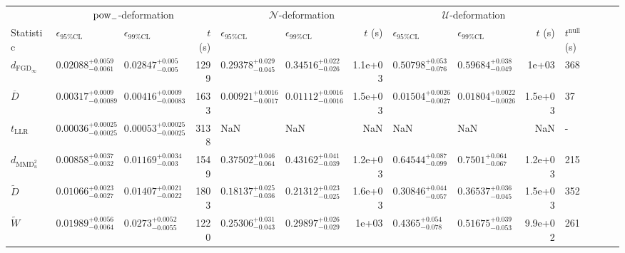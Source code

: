 \begin{tabular}{l|llr|llr|llr|llr}
		\toprule
		\multicolumn{1}{c}{}      & \multicolumn{3}{c}{$\rm{pow}_{-}$-deformation}      & \multicolumn{3}{c}{$\mathcal{N}$-deformation}      & \multicolumn{3}{c}{$\mathcal{U}$-deformation}      & \multicolumn{3}{c}{} \\
		Statistic & $\epsilon_{95\%\mathrm{CL}}$ & $\epsilon_{99\%\mathrm{CL}}$ & $t$ (s) & $\epsilon_{95\%\mathrm{CL}}$ & $\epsilon_{99\%\mathrm{CL}}$ & $t$ (s) & $\epsilon_{95\%\mathrm{CL}}$ & $\epsilon_{99\%\mathrm{CL}}$ & $t$ (s) & $t^{\mathrm{null}}$ (s) \\
		\midrule
		$d_{\mathrm{FGD}_{\infty}}$ & $0.02088_{-0.0061}^{+0.0059}$ & $0.02847_{-0.005}^{+0.005}$ & 1299 & $0.29378_{-0.045}^{+0.029}$ & $0.34516_{-0.026}^{+0.022}$ & 1.1e+03 & $0.50798_{-0.076}^{+0.053}$ & $0.59684_{-0.049}^{+0.038}$ & 1e+03 & 368 \\
		$\overline{D}$ & $0.00317_{-0.00089}^{+0.0009}$ & $0.00416_{-0.00083}^{+0.0009}$ & 1633 & $0.00921_{-0.0017}^{+0.0016}$ & $0.01112_{-0.0016}^{+0.0016}$ & 1.5e+03 & $0.01504_{-0.0027}^{+0.0026}$ & $0.01804_{-0.0026}^{+0.0022}$ & 1.5e+03 & 37 \\
		$t_{\mathrm{LLR}}$ & $0.00036_{-0.00025}^{+0.00025}$ & $0.00053_{-0.00025}^{+0.00025}$ & 3138 & NaN & NaN & NaN & NaN & NaN & NaN & - \\
		$d_{\mathrm{MMD}^{2}_{u}}$ & $0.00858_{-0.0032}^{+0.0037}$ & $0.01169_{-0.003}^{+0.0034}$ & 1549 & $0.37502_{-0.064}^{+0.046}$ & $0.43162_{-0.039}^{+0.041}$ & 1.2e+03 & $0.64544_{-0.099}^{+0.087}$ & $0.7501_{-0.067}^{+0.064}$ & 1.2e+03 & 215 \\
		$\widetilde{D}$ & $0.01066_{-0.0027}^{+0.0023}$ & $0.01407_{-0.0022}^{+0.0021}$ & 1803 & $0.18137_{-0.036}^{+0.025}$ & $0.21312_{-0.025}^{+0.023}$ & 1.6e+03 & $0.30846_{-0.057}^{+0.044}$ & $0.36537_{-0.045}^{+0.036}$ & 1.5e+03 & 352 \\
		$\widetilde{W}$ & $0.01989_{-0.0064}^{+0.0056}$ & $0.0273_{-0.0055}^{+0.0052}$ & 1220 & $0.25306_{-0.043}^{+0.031}$ & $0.29897_{-0.029}^{+0.026}$ & 1e+03 & $0.4365_{-0.078}^{+0.054}$ & $0.51675_{-0.053}^{+0.039}$ & 9.9e+02 & 261 \\
		\bottomrule
		\end{tabular}